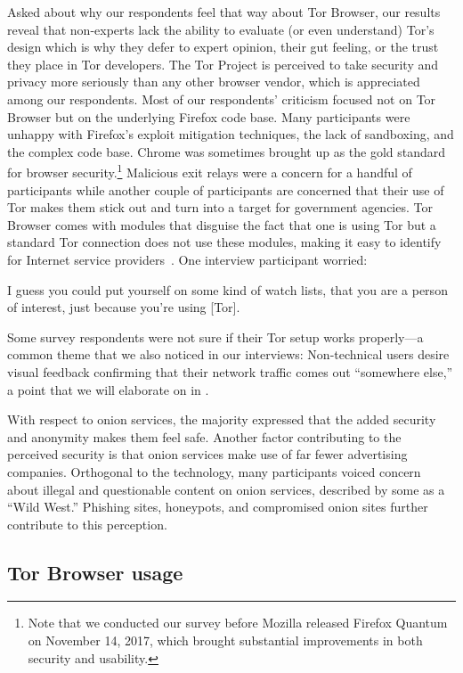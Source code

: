 Asked about why our respondents feel that way about Tor Browser, our results
reveal that non-experts lack the ability to evaluate (or even understand) Tor's
design which is why they defer to expert opinion, their gut feeling, or the
trust they place in Tor developers.  The Tor Project is perceived to take
security and privacy more seriously than any other browser vendor, which is
appreciated among our respondents.  Most of our respondents' criticism focused
not on Tor Browser but on the underlying Firefox code base.  Many participants
were unhappy with Firefox's exploit mitigation techniques, the lack of
sandboxing, and the complex code base.  Chrome was sometimes brought up as the
gold standard for browser security.\footnote{Note that we conducted our survey
before Mozilla released Firefox Quantum on November 14, 2017, which brought
substantial improvements in both security and usability.}  Malicious exit relays
were a concern for a handful of participants while another couple of
participants are concerned that their use of Tor makes them stick out and turn
into a target for government agencies.  Tor Browser comes with modules that
disguise the fact that one is using Tor but a standard Tor connection does not
use these modules, making it easy to identify for Internet service
providers~\cite{pluggable}.  One interview participant worried:

\begin{displayquote}[P03]
I guess you could put yourself on some kind of watch lists, that you are a
person of interest, just because you're using [Tor].
\end{displayquote}

Some survey respondents were not sure if their Tor setup works properly---a
common theme that we also noticed in our interviews: Non-technical users desire
visual feedback confirming that their network traffic comes out ``somewhere
else,'' a point that we will elaborate on in .

With respect to onion services, the majority expressed that the added security
and anonymity makes them feel safe.  Another factor contributing to the
perceived security is that onion services make use of far fewer advertising
companies.  Orthogonal to the technology, many participants voiced concern about
illegal and questionable content on onion services, described by some as a
``Wild West.''  Phishing sites, honeypots, and compromised onion sites further
contribute to this perception.

\subsection{Tor Browser usage}

